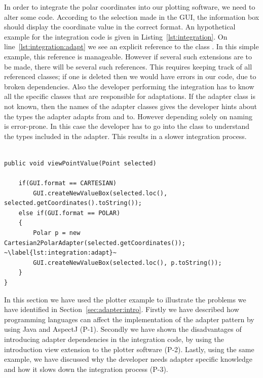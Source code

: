 In order to integrate the polar coordinates into our plotting software, we need to alter some code. 
According to the selection made in the GUI, the information box should display the coordinate value in the correct format. 
An hypothetical example for the integration code is given in Listing~\ref{lst:integration}.
On line~\ref{lst:integration:adapt} we see an explicit reference to the class .
In this simple example, this reference is manageable. 
However if several such extensions are to be made, there will be several such references.
This requires keeping track of all referenced classes; if one is deleted then we would have errors in our code, due to broken dependencies. 
Also the developer performing the integration has to know all the specific classes that are responsible for adaptations. 
If the adapter class is not known, then the names of the adapter classes gives the developer hints about the types the adapter adapts from and to. 
However depending solely on naming is error-prone. 
In this case the developer has to go into the class to understand the types included in the adapter. 
This results in a slower integration process.

\begin{lstlisting}[float, caption={The integration of Polar coordinates}, label={lst:integration}]

public void viewPointValue(Point selected)

	if(GUI.format == CARTESIAN)
		GUI.createNewValueBox(selected.loc(), selected.getCoordinates().toString());
	else if(GUI.format == POLAR)
	{
		Polar p = new Cartesian2PolarAdapter(selected.getCoordinates()); ~\label{lst:integration:adapt}~
		GUI.createNewValueBox(selected.loc(), p.toString());
	}
}
\end{lstlisting}

In this section we have used the plotter example to illustrate the problems we have identified in Section~\ref{sec:adapter:intro}. 
Firstly we have described how programming languages can affect the implementation of the adapter pattern by using Java and AspectJ (P-1). 
Secondly we have shown the disadvantages of introducing adapter dependencies in the integration code, by using the introduction  view extension to the plotter software (P-2).
Lastly, using the same example, we have discussed why the developer needs adapter specific knowledge and how it slows down the integration process (P-3). 



